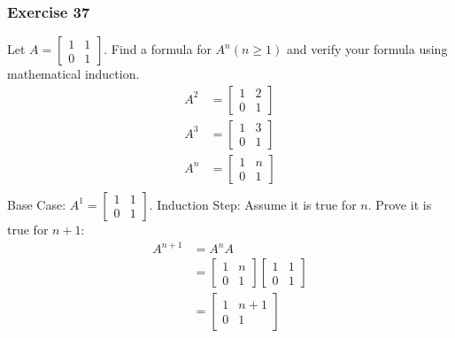 \documentclass{math}
\begin{document}
\subsubsection*{Exercise 37}
Let \( A = \begin{bmatrix}1 & 1 \\ 0 & 1\end{bmatrix} \). Find a formula for
\( A^n(n\ge1) \) and verify your formula using mathematical induction.
\begin{align*}
  A^2 &= \begin{bmatrix}
    1 & 2 \\
    0 & 1
  \end{bmatrix} \\
  A^3 &= \begin{bmatrix}
    1 & 3 \\
    0 & 1
  \end{bmatrix} \\
  A^n &= \begin{bmatrix}
    1 & n \\
    0 & 1
  \end{bmatrix} \\
\end{align*}
Base Case: \( A^1 = \begin{bmatrix}1 & 1 \\ 0 & 1\end{bmatrix} \).
Induction Step: Assume it is true for \( n \). Prove it is true for \( n+1 \):
\begin{align*}
  A^{n+1} &= A^nA \\
  &= \begin{bmatrix}
    1 & n \\
    0 & 1
  \end{bmatrix}\begin{bmatrix}
    1 & 1 \\
    0 & 1
  \end{bmatrix} \\
  &= \begin{bmatrix}
    1 & n+1 \\
    0 & 1
  \end{bmatrix}
\end{align*}
\end{document}

